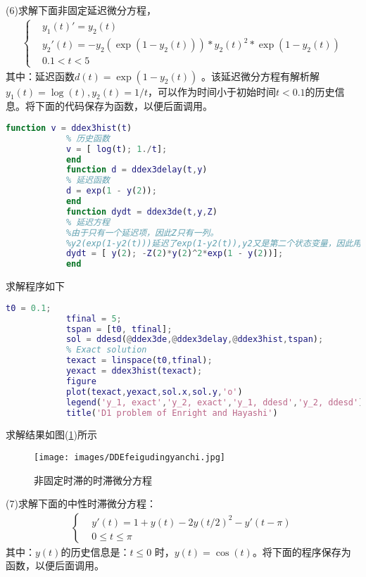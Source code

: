 	        (6)求解下面非固定延迟微分方程，
	        \begin{align*}
			\left\{
			\begin{aligned}
			& y_1(t)'=y_2(t)\\
			& y_2'(t)=-y_2(\exp(1-y_2(t)))*y_2(t)^2*\exp(1-y_2(t))\\
			& 0.1<t<5
			\end{aligned}
			\right.
	        \end{align*}
	        其中：延迟函数$d(t) = \exp(1-y_2(t))$ 。该延迟微分方程有解析解 $y_1(t) = \log (t),y_2(t)=1/t$，可以作为时间小于初始时间$t<0.1$的历史信息。将下面的代码保存为函数，以便后面调用。
	        \begin{lstlisting}[language = Matlab]
			 function v = ddex3hist(t)
		    % 历史函数
		    v = [ log(t); 1./t];
		    end
		    function d = ddex3delay(t,y)
		    % 延迟函数
		    d = exp(1 - y(2));
		    end
		    function dydt = ddex3de(t,y,Z)
		    % 延迟方程
		    %由于只有一个延迟项，因此Z只有一列。
		    %y2(exp(1-y2(t)))延迟了exp(1-y2(t)),y2又是第二个状态变量，因此用Z（2）表示。
		    dydt = [ y(2); -Z(2)*y(2)^2*exp(1 - y(2))];
		    end
	        \end{lstlisting}
	        求解程序如下
	        \begin{lstlisting}[language = Matlab]
			t0 = 0.1;
			tfinal = 5;
			tspan = [t0, tfinal];
			sol = ddesd(@ddex3de,@ddex3delay,@ddex3hist,tspan);
			% Exact solution
			texact = linspace(t0,tfinal);
			yexact = ddex3hist(texact);
			figure
			plot(texact,yexact,sol.x,sol.y,'o')
			legend('y_1, exact','y_2, exact','y_1, ddesd','y_2, ddesd')
			title('D1 problem of Enright and Hayashi')
	        \end{lstlisting}
	        求解结果如图(\ref{非固定时滞的时滞微分方程})所示
			\begin{figure}[H]
	        \centering
	        \texttt{[image: images/DDEfeigudingyanchi.jpg]}
	        \caption{非固定时滞的时滞微分方程}
	        \label{非固定时滞的时滞微分方程}
	        \end{figure}
	        (7)求解下面的中性时滞微分方程：
	        \begin{align*}
			\left\{
			\begin{aligned}
			& y'(t)=1+y(t)-2y(t/2)^2-y'(t-\pi)\\
			& 0\leq t \leq \pi
			\end{aligned}
			\right.
	        \end{align*}
	        其中：$y(t)$的历史信息是：$t \leqslant 0$ 时，$y(t) = \cos (t)$。将下面的程序保存为函数，以便后面调用。
